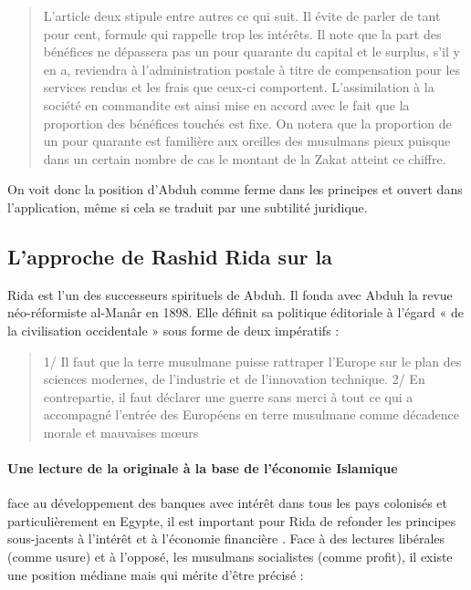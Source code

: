 \begin{quote}
    L'article deux stipule entre autres ce qui suit. Il évite de parler de tant pour
cent, formule qui rappelle trop les intérêts. Il note que la part des bénéfices ne
dépassera pas un pour quarante du capital et le surplus, s'il y en a, reviendra à
l'administration postale à titre de compensation pour les services rendus et les
frais que ceux-ci comportent. L'assimilation à la société en commandite est ainsi
mise en accord avec le fait que la proportion des bénéfices touchés est fixe. On
notera que la proportion de un pour quarante est familière aux oreilles des
musulmans pieux puisque dans un certain nombre de cas le montant de la Zakat
atteint ce chiffre.
\end{quote}

On voit donc la position d'Abduh comme ferme dans les principes et ouvert dans l'application, même si cela se traduit par une subtilité juridique.


\subsection{L'approche de Rashid Rida sur la \riba} 

Rida est l'un des successeurs spirituels de Abduh. Il fonda avec Abduh la revue néo-réformiste al-Manâr en   1898. Elle définit sa politique éditoriale à l’égard « de la civilisation occidentale » sous forme de deux impératifs : 
\begin{quote}
    \item  1/ Il faut que la terre musulmane puisse rattraper l’Europe sur le plan des sciences modernes, de l’industrie et de l’innovation technique. 
    \textbf{ }2/ En contrepartie, il faut déclarer une guerre sans merci à tout ce qui a accompagné l’entrée des Européens en terre musulmane comme décadence morale et mauvaises mœurs
\end{quote}

\paragraph{Une lecture de la \riba originale à la base de l'économie Islamique } face au développement des banques avec intérêt dans tous les pays colonisés et particulièrement en Egypte, il est important pour Rida de refonder les principes sous-jacents à l'intérêt et à l'économie financière \cite{Siddique:DemystifyingRiba}. Face à des lectures libérales (\riba comme usure) et à l'opposé, les musulmans socialistes (\riba comme profit), il existe une position médiane mais qui mérite d'être précisé : 


